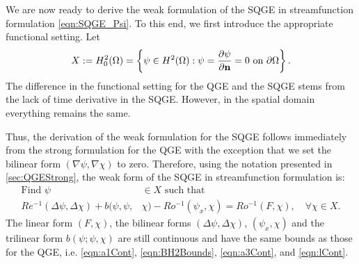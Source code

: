 We are now ready to derive the weak formulation of the SQGE in streamfunction
formulation \eqref{eqn:SQGE_Psi}. To this end, we first introduce the
appropriate functional setting. Let
\begin{equation*}
  X := H^2_0(\Omega) = \left\{ \psi\in H^2(\Omega): \psi=\frac{\partial\psi}{\partial {\bf n}}=0
    \text{ on } \partial\Omega \right\} .
\end{equation*}
The difference in the functional setting for the QGE and the SQGE stems from the
lack of time derivative in the SQGE. However, in the spatial domain everything
remains the same.

Thus, the derivation of the weak formulation for the SQGE follows immediately
from the strong formulation for the QGE with the exception that we set the
bilinear form $(\nabla \psi, \nabla \chi)$ to zero. Therefore, using the
notation presented in \autoref{sec:QGEStrong}, the weak form of the SQGE in streamfunction
formulation is:
\begin{equation}
  \begin{split}
    \text{Find }\psi &\in X \text{ such that} \\
    Re^{-1} (\Delta \psi, \Delta \chi) + b(\psi,\psi,&\chi) - Ro^{-1} (\psi_x,\chi) =
      Ro^{-1} (F,\chi),\quad \forall \chi \in X.  \end{split} \label{eqn:SQGEWF}
\end{equation}
The linear form $(F, \chi)$, the bilinear forms $(\Delta \psi, \Delta \chi)$,
$(\psi_x, \chi)$ and the trilinear form $b(\psi;\psi,\chi)$ are still continuous
\cite{Cayco86} and have the same bounds as those for the QGE, i.e.
\eqref{eqn:a1Cont}, \eqref{eqn:BH2Bounds}, \eqref{eqn:a3Cont}, and
\eqref{eqn:lCont}.

